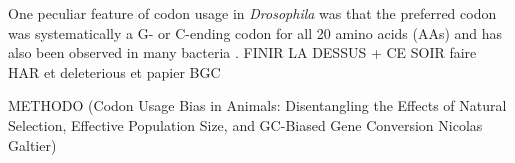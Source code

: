 One peculiar feature of codon usage in \textit{Drosophila} was that the preferred codon was systematically a G- or C-ending codon for all 20 amino acids (AAs) \citep[cited in][]{duret2009biased} and has also been observed in many bacteria \citep{hershberg2009general}.
FINIR LA DESSUS
+ CE SOIR faire HAR et deleterious et papier BGC




%
%





METHODO (Codon Usage Bias in Animals: Disentangling the Effects of Natural Selection, Effective Population Size, and GC-Biased Gene Conversion  Nicolas Galtier)

